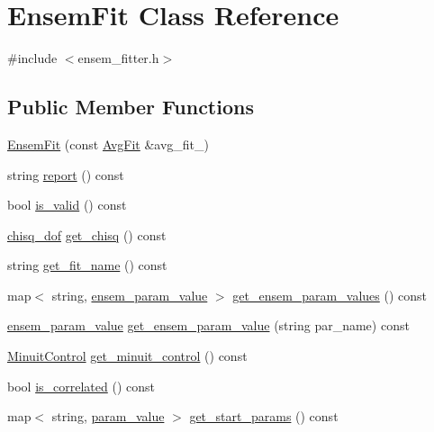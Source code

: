 \hypertarget{classEnsemFit}{}\section{Ensem\+Fit Class Reference}
\label{classEnsemFit}


{\ttfamily \#include $<$ensem\+\_\+fitter.\+h$>$}

\subsection*{Public Member Functions}
\begin{DoxyCompactItemize}
\item 
\mbox{\hyperlink{classEnsemFit_ae8fc27d065976ce4b2a357b457e7755d}{Ensem\+Fit}} (const \mbox{\hyperlink{classAvgFit}{Avg\+Fit}} \&avg\+\_\+fit\+\_\+)
\item 
string \mbox{\hyperlink{classEnsemFit_a699cb4ec2b3d2107c67aaed422414f4d}{report}} () const
\item 
bool \mbox{\hyperlink{classEnsemFit_a5f154286b15fe9dbfe74fd5e00b4ed11}{is\+\_\+valid}} () const
\item 
\mbox{\hyperlink{structchisq__dof}{chisq\+\_\+dof}} \mbox{\hyperlink{classEnsemFit_a4122f6735d730a4759cc134056b8aa96}{get\+\_\+chisq}} () const
\item 
string \mbox{\hyperlink{classEnsemFit_a16f3c8ad4cdab894e5e4e1262bc9fcb6}{get\+\_\+fit\+\_\+name}} () const
\item 
map$<$ string, \mbox{\hyperlink{structensem__param__value}{ensem\+\_\+param\+\_\+value}} $>$ \mbox{\hyperlink{classEnsemFit_aefa2dcc89aad7c209fac39ebba06372a}{get\+\_\+ensem\+\_\+param\+\_\+values}} () const
\item 
\mbox{\hyperlink{structensem__param__value}{ensem\+\_\+param\+\_\+value}} \mbox{\hyperlink{classEnsemFit_afa01cceaae9172656f561cdd2d63121b}{get\+\_\+ensem\+\_\+param\+\_\+value}} (string par\+\_\+name) const
\item 
\mbox{\hyperlink{structMinuitControl}{Minuit\+Control}} \mbox{\hyperlink{classEnsemFit_a47405314215c4adc9420af46dd5d9572}{get\+\_\+minuit\+\_\+control}} () const
\item 
bool \mbox{\hyperlink{classEnsemFit_a1abab16ecba6b2a75d6d570585d35e9a}{is\+\_\+correlated}} () const
\item 
map$<$ string, \mbox{\hyperlink{structparam__value}{param\+\_\+value}} $>$ \mbox{\hyperlink{classEnsemFit_a24424685749c260b1db4e63e34de74ae}{get\+\_\+start\+\_\+params}} () const
\item 

\end{DoxyCompactItemize}
